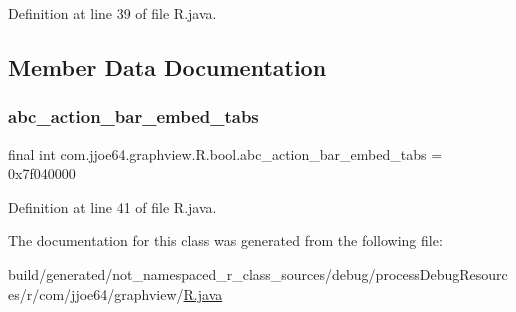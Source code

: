 Definition at line 39 of file R.\+java.


\begin{DoxyCode}{0}

\end{DoxyCode}


\subsection{Member Data Documentation}
\mbox{\label{classcom_1_1jjoe64_1_1graphview_1_1_r_1_1bool_ab29113a31571e3264e195fe02b515053}} 
\subsubsection{\texorpdfstring{abc\_action\_bar\_embed\_tabs}{abc\_action\_bar\_embed\_tabs}}
{\footnotesize\ttfamily final int com.\+jjoe64.\+graphview.\+R.\+bool.\+abc\+\_\+action\+\_\+bar\+\_\+embed\+\_\+tabs = 0x7f040000\hspace{0.3cm}{\ttfamily [static]}}



Definition at line 41 of file R.\+java.



The documentation for this class was generated from the following file\+:\begin{DoxyCompactItemize}
\item 
build/generated/not\+\_\+namespaced\+\_\+r\+\_\+class\+\_\+sources/debug/process\+Debug\+Resources/r/com/jjoe64/graphview/\mbox{\hyperlink{com_2jjoe64_2graphview_2_r_8java}{R.\+java}}\end{DoxyCompactItemize}
